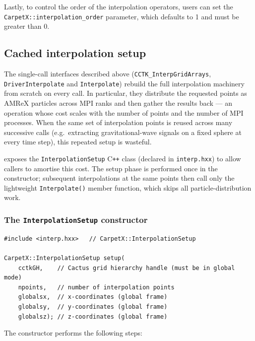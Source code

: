 Lastly, to control the order of the interpolation operators, users can set the \texttt{CarpetX::interpolation\_order} parameter, which defaults to 1 and must be greater than 0.

\subsection{Cached interpolation setup}
\label{sec:interp_setup}

The single-call interfaces described above (\texttt{CCTK\_InterpGridArrays}, \texttt{DriverInterpolate} and \texttt{Interpolate}) rebuild the full interpolation machinery from scratch on every call. In particular, they distribute the requested points as AMReX particles across MPI ranks and then gather the results back --- an operation whose cost scales with the number of points and the number of MPI processes. When the same set of interpolation points is reused across many successive calls (e.g.\ extracting gravitational-wave signals on a fixed sphere at every time step), this repeated setup is wasteful.

\CarpetX\space exposes the \texttt{InterpolationSetup} C\texttt{++} class (declared in \texttt{interp.hxx}) to allow callers to amortise this cost. The setup phase is performed once in the constructor; subsequent interpolations at the same points then call only the lightweight \texttt{Interpolate()} member function, which skips all particle-distribution work.

\subsubsection{The \texttt{InterpolationSetup} constructor}

\begin{lstlisting}
#include <interp.hxx>   // CarpetX::InterpolationSetup

CarpetX::InterpolationSetup setup(
    cctkGH,    // Cactus grid hierarchy handle (must be in global mode)
    npoints,   // number of interpolation points
    globalsx,  // x-coordinates (global frame)
    globalsy,  // y-coordinates (global frame)
    globalsz); // z-coordinates (global frame)
\end{lstlisting}

The constructor performs the following steps:

